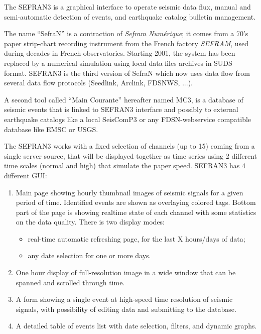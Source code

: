 The SEFRAN3 is a graphical interface to operate seismic data flux, manual and semi-automatic detection of events, and earthquake catalog bulletin management.

The name ``SefraN'' is a contraction of \textit{Sefram Numérique}; it comes from a 70's paper strip-chart recording instrument from the French factory \textit{SEFRAM\textregistered}, used during decades in French observatories. Starting 2001, the system has been replaced by a numerical simulation using local data files archives in SUDS format. SEFRAN3 is the third version of SefraN which now uses data flow from several data flow protocols (Seedlink, Arclink, FDSNWS, ...).

A second tool called ``Main Courante'' hereafter named MC3, is a database of seismic events that is linked to SEFRAN3 interface and possibly to external earthquake catalogs like a local SeisComP3 or any FDSN-webservice compatible database like EMSC or USGS.

The SEFRAN3 works with a fixed selection of channels (up to 15) coming from a single server source, that will be displayed together as time series using 2 different time scales (normal and high) that simulate the paper speed. SEFRAN3 has 4 different GUI:
\begin{enumerate}

\item Main page showing hourly thumbnail images of seismic signals for a given period of time. Identified events are shown as overlaying colored tags. Bottom part of the page is showing realtime state of each channel with some statistics on the data quality. There is two display modes:
\begin{itemize}
\item real-time automatic refreshing page, for the last X hours/days of data;
\item any date selection for one or more days.
\end{itemize}

\item One hour display of full-resolution image in a wide window that can be spanned and scrolled through time.

\item A form showing a single event at high-speed time resolution of seismic signals, with possibility of editing data and submitting to the database.

\item A detailed table of events list with date selection, filters, and dynamic graphs.

\end{enumerate}

